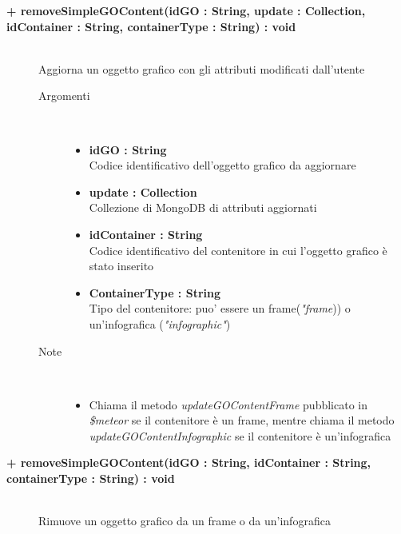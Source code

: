 \begin{description}
	\begin{description}
		\item[\textbf{\color{blue}+ removeSimpleGOContent(idGO : String, update : Collection, idContainer : String, containerType : String) : void			}] \hfill \\
			Aggiorna un oggetto grafico con gli attributi modificati dall'utente
			
		\begin{description}
			\item[Argomenti] \hfill \\
				\begin{itemize}
					\item \textbf{idGO : String			} \hfill \\
					Codice identificativo dell'oggetto grafico da aggiornare
					\item \textbf{update : Collection			} \hfill \\
					Collezione di MongoDB di attributi aggiornati
					\item \textbf{idContainer : String			} \hfill \\
					Codice identificativo del contenitore in cui l'oggetto grafico è stato inserito
					\item \textbf{ContainerType : String			} \hfill \\
					Tipo del contenitore: puo' essere un frame(\textit{"frame})) o un'infografica (\textit{"infographic"})
					
				\end{itemize}
			\item[Note] \hfill \\
			\begin{itemize}
					\item Chiama il metodo \textit{updateGOContentFrame} pubblicato in \textit{\$meteor} se il contenitore è un frame, mentre chiama il metodo \textit{updateGOContentInfographic} se il contenitore è un'infografica
			\end{itemize}
		\end{description}
	\end{description}
	
	\begin{description}
		\item[\textbf{\color{blue}+ removeSimpleGOContent(idGO : String, idContainer : String, containerType : String) : void			}] \hfill \\
			Rimuove un oggetto grafico da un frame o da un'infografica
			

\end{description}
\end{description}
